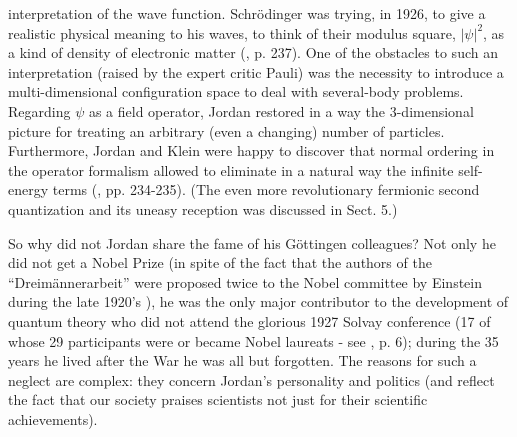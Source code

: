\documentclass[12pt]{article}
\begin{document}
interpretation of the wave function. Schr\"odinger was trying, in 1926, to give a realistic physical meaning to his waves, to think of 
their modulus square, $|\psi|^2$, as a kind of density of electronic matter (\cite{Dar}, p. 237). One of the obstacles to such an 
interpretation (raised by the expert critic Pauli) was the necessity to introduce a multi-dimensional configuration space to deal with 
several-body problems. Regarding $\psi$ as a field operator, Jordan restored in a way the 3-dimensional picture for treating 
an arbitrary (even a changing) number of particles. Furthermore, Jordan and Klein \cite{JK27} 
were happy to discover that normal ordering in the operator formalism allowed to eliminate in a natural way the
infinite self-energy terms (\cite{Dar}, pp. 234-235). (The even more revolutionary fermionic second quantization
and its uneasy reception was discussed in Sect.  5.)

So why did not Jordan share the fame of his G\"ottingen colleagues? Not only he did not get a Nobel
Prize (in spite of the fact that the authors of the ``Dreim\"annerarbeit'' were proposed twice to the
Nobel committee by Einstein during the late 1920's \cite{S06}), he was the only major contributor to
the development of quantum theory who did not attend the glorious 1927 Solvay conference (17 of whose
29 participants were or became Nobel laureats - see \cite{Sch}, p. 6); during the 35 years he lived
after the War he was all but forgotten. The reasons for such a neglect are complex: they concern
Jordan's personality and politics (and reflect the fact that our society praises scientists not just
for their scientific achievements).
\end{document}
